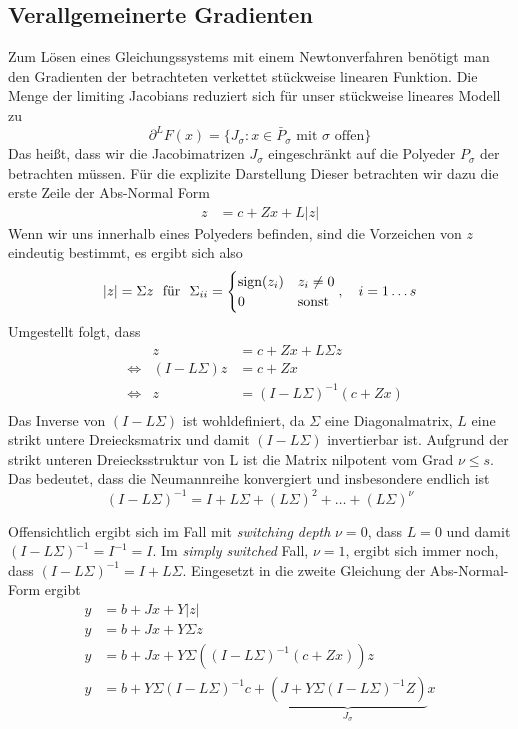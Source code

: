 \subsection{Verallgemeinerte Gradienten}

Zum Lösen eines Gleichungssystems mit einem Newtonverfahren benötigt man den Gradienten der betrachteten verkettet stückweise linearen Funktion. 
Die Menge der limiting Jacobians reduziert sich für unser stückweise lineares Modell zu 
\[
 \partial^L F(x) = \lbrace J_\sigma: x\in \bar P_\sigma \text{ mit }\sigma \text{ offen} \rbrace
\]
Das heißt, dass wir die Jacobimatrizen $J_\sigma$ eingeschränkt auf die Polyeder $P_\sigma$ der betrachten müssen.
Für die explizite Darstellung Dieser betrachten wir dazu die erste Zeile der Abs-Normal Form
\begin{align*}
	z &= c+ Zx + L|z|
\end{align*}
Wenn wir uns innerhalb eines Polyeders befinden, sind die Vorzeichen von $z$ eindeutig bestimmt, es ergibt sich also  
\begin{align*}
|z| = \Sigma z~ \text{ für }~\Sigma_{ii} =\begin{cases} 
\text{sign}(z_i) & z_i\neq 0\\
0 & \text{sonst}
 \end{cases},\quad i=1\ldots s
\end{align*}
Umgestellt folgt, dass 
\begin{align*}
&&z &= c+ Zx + L\Sigma z\\
&\iff & (I-L\Sigma)z &= c+ Zx \\
&\iff & z &= (I-L\Sigma)^{-1}(c+ Zx)\\
\end{align*}
Das Inverse von $(I-L\Sigma)$ ist wohldefiniert, da $\Sigma$ eine Diagonalmatrix, $L$ eine strikt untere Dreiecksmatrix und damit $(I-L\Sigma)$ invertierbar ist. 
Aufgrund der strikt unteren Dreiecksstruktur von L ist die Matrix nilpotent vom Grad $\nu\leq s$. Das bedeutet, dass die Neumannreihe konvergiert und insbesondere endlich ist
\[
(I-L\Sigma)^{-1} = I+L\Sigma + (L\Sigma)^2 + \ldots + (L\Sigma)^{\nu}
\] 

Offensichtlich ergibt sich im Fall mit \textit{switching depth} $\nu = 0$, dass $L=0$ und damit $(I-L\Sigma)^{-1} = I^{-1} = I$. Im \textit{simply switched} Fall, $\nu=1$, ergibt sich immer noch, dass $(I-L\Sigma)^{-1} =I+L\Sigma$.
Eingesetzt in die zweite Gleichung der Abs-Normal-Form ergibt
\begin{align*}
y &= b+Jx + Y|z|\\
y &= b+Jx + Y\Sigma z\\
y &= b+ Jx + Y\Sigma ((I-L\Sigma)^{-1}(c+ Zx))z\\
y &= b + Y\Sigma(I-L\Sigma)^{-1}c+\underbrace{(J+Y\Sigma(I-L\Sigma)^{-1}Z)}_{J_\sigma}x \\
\end{align*}

